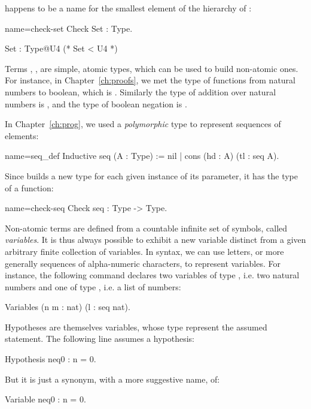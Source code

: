  happens to be a name for the smallest element of the
hierarchy of :

\begin{coq-left}{name=check-set}{}
Check Set : Type.
\end{coq-left}
\begin{coqout-right}
Set : Type@{U4} (* Set < U4 *)
\end{coqout-right}

Terms , ,  are simple, atomic types, which can be used
to build non-atomic ones. For instance, in Chapter~\ref{ch:proofs}, we
met the type of functions from natural numbers to boolean, which is .
Similarly the type of addition over natural numbers is 
, and the type of boolean negation is 
.

In Chapter~\ref{ch:prog}, we used a \emph{polymorphic} type to represent
sequences of elements:

\begin{coq}{name=seq_def}{}
Inductive seq (A : Type) := nil | cons (hd : A) (tl : seq A).
\end{coq}

Since  builds a new type for each given instance of its
parameter, it has the type of a function:

\begin{coq}{name=check-seq}{}
Check seq : Type -> Type.
\end{coq}

Non-atomic terms are defined from a countable infinite set of
symbols, called  \emph{variables}.
It is thus always possible to exhibit a new variable
distinct from a given arbitrary finite collection of variables. In \Coq{}
syntax, we can use letters, or more generally sequences of
alpha-numeric characters, to represent variables. For instance, the
following command declares two variables of type , i.e. two
natural numbers and one of type , i.e. a list of numbers:

\begin{coq}{}{}
Variables (n m : nat) (l : seq nat).
\end{coq}

Hypotheses are themselves variables, whose type represent the
assumed statement. The following line assumes a hypothesis:

\begin{coq}{}{}
Hypothesis neq0 : n = 0.
\end{coq}
But it is just a synonym, with a more suggestive name, of:
\begin{coq}{}{}
Variable neq0 : n = 0.
\end{coq}

